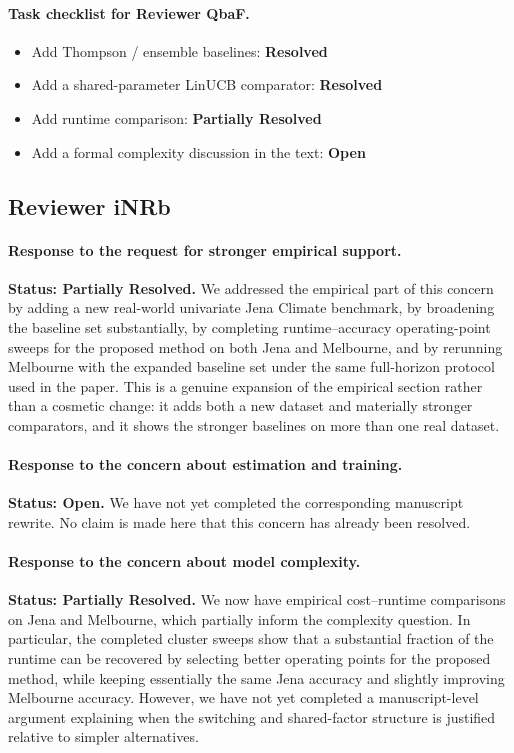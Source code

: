 \documentclass[11pt]{article}
\newcommand{\resolved}{\textbf{Resolved}}
\newcommand{\partialresolved}{\textbf{Partially Resolved}}
\newcommand{\openissue}{\textbf{Open}}
\begin{document}
\paragraph{Task checklist for Reviewer QbaF.}
\begin{itemize}[leftmargin=1.5em]
    \item Add Thompson / ensemble baselines: \resolved
    \item Add a shared-parameter LinUCB comparator: \resolved
    \item Add runtime comparison: \partialresolved
    \item Add a formal complexity discussion in the text: \openissue
\end{itemize}

\subsection*{Reviewer iNRb}

\paragraph{Response to the request for stronger empirical support.}
\textbf{Status: \partialresolved.}
We addressed the empirical part of this concern by adding a new real-world univariate Jena Climate benchmark, by broadening the baseline set substantially, by completing runtime--accuracy operating-point sweeps for the proposed method on both Jena and Melbourne, and by rerunning Melbourne with the expanded baseline set under the same full-horizon protocol used in the paper. This is a genuine expansion of the empirical section rather than a cosmetic change: it adds both a new dataset and materially stronger comparators, and it shows the stronger baselines on more than one real dataset.

\paragraph{Response to the concern about estimation and training.}
\textbf{Status: \openissue.}
We have not yet completed the corresponding manuscript rewrite. No claim is made here that this concern has already been resolved.

\paragraph{Response to the concern about model complexity.}
\textbf{Status: \partialresolved.}
We now have empirical cost--runtime comparisons on Jena and Melbourne, which partially inform the complexity question. In particular, the completed cluster sweeps show that a substantial fraction of the runtime can be recovered by selecting better operating points for the proposed method, while keeping essentially the same Jena accuracy and slightly improving Melbourne accuracy. However, we have not yet completed a manuscript-level argument explaining when the switching and shared-factor structure is justified relative to simpler alternatives.
\end{document}
